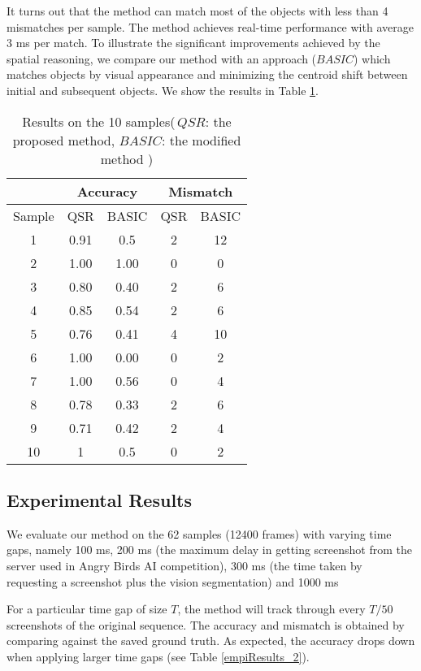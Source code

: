 \documentclass[letterpaper]{article}
\begin{document}
It turns out that the method can match most of the objects with less than 4 mismatches per sample. The method achieves real-time performance with average 3 ms per match. To illustrate the significant improvements achieved by the spatial reasoning, we compare our method with an approach  ($BASIC$) which matches objects by visual appearance and minimizing the centroid shift between initial and subsequent objects. We show the results in Table \ref{empiResults}.

\begin{table}[h!]
\caption{Results on the 10 samples(\,$QSR$: the proposed method, $BASIC$: the modified method )}\label{empiResults}
\centering
\begin{tabular}{c|c|c|c|c}
\hline
{} & \multicolumn{2}{c}{Accuracy} & \multicolumn{2}{c}{Mismatch}\\
\hline
Sample & QSR & BASIC & QSR & BASIC \\
\hline
1& 0.91 & 0.5 & 2 & 12\\
2&1.00 & 1.00 & 0 & 0\\
3&0.80 & 0.40 & 2 & 6\\
4&0.85 & 0.54 & 2 & 6\\
5&0.76 & 0.41 & 4 & 10\\
6&1.00 & 0.00 & 0 & 2\\
7&1.00 & 0.56 & 0 & 4\\
8&0.78 & 0.33 & 2 & 6 \\
9&0.71 & 0.42 & 2 & 4\\
10&1 & 0.5 & 0 & 2\\
\hline
\end{tabular}
\end{table}

\subsection{Experimental Results}

We evaluate our method on the 62 samples (12400 frames) with varying time gaps, namely 100 ms, 200 ms (the maximum delay in getting screenshot from the server used in Angry Birds AI competition), 300 ms (the time taken by requesting a screenshot plus the vision segmentation) and 1000 ms

For a particular time gap of size $T$, the method will track through every $T/50$ screenshots of the original sequence. The accuracy and mismatch is obtained by comparing against the saved ground truth. As expected, the accuracy drops down when applying larger time gaps (see Table \ref{empiResults_2}).  
\end{document}
